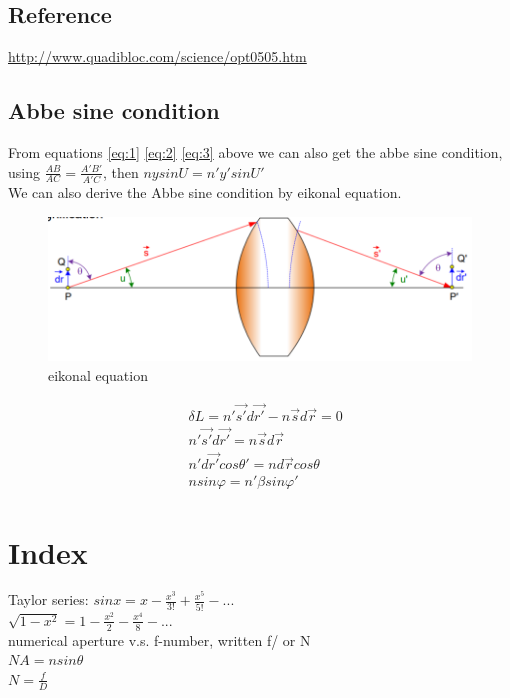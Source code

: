 \documentclass[../main.tex]{subfiles}
\begin{document}
	\subsection{Reference}
	\url{http://www.quadibloc.com/science/opt0505.htm}

	\subsection{Abbe sine condition}
	From equations \ref{eq:1} \ref{eq:2} \ref{eq:3} above we can also get the abbe sine condition, using $\frac{AB}{AC}=\frac{A'B'}{A'C}$, then $nysinU=n'y'sinU'$\\
	We can also derive the Abbe sine condition by eikonal equation.
	\begin{figure}[h!]
		\centering
		\includegraphics[scale=0.7]{../graphics/Geometrical_optics15.png}
		\caption{eikonal equation}
		\label{fig:eikonal}
	\end{figure}
	\begin{align}
		&\delta L=n'\vec{s'}d\vec{r'}-n\vec{s}d\vec{r}=0\\
		&n'\vec{s'}d\vec{r'}=n\vec{s}d\vec{r}\\
		&n'd\vec{r'}cos\theta'=nd\vec{r}cos\theta\\
		&nsin\varphi=n'\beta sin\varphi'
	\end{align}

	\section{Index}
	Taylor series:
	$sinx=x-\frac{x^3}{3!}+\frac{x^5}{5!}-...$\\
	$\sqrt{1-x^2}=1-\frac{x^2}{2}-\frac{x^4}{8}-...$\\
	numerical aperture v.s. f-number, written f/ or N\\
	$NA=nsin\theta$\\
	$N=\frac{f}{D}$\\
\end{document}
